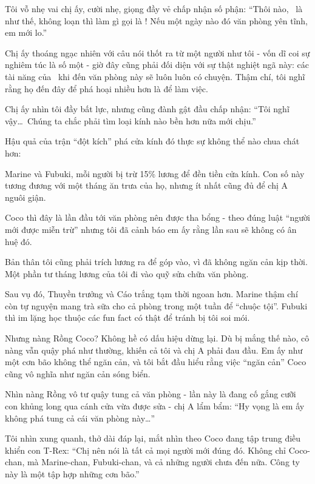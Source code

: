 \documentclass[../main.tex]{subfiles}
\begin{document}
Tôi vỗ nhẹ vai chị ấy, cười nhẹ, giọng đầy vẻ chấp nhận số phận: ``Thôi nào, \hll\ là như thế, không loạn thì làm gì gọi là \hll! Nếu một ngày nào đó văn phòng yên tĩnh, em mới lo.''

Chị ấy thoáng ngạc nhiên với câu nói thốt ra từ một người như tôi - vốn dĩ coi sự nghiêm túc là số một - giờ đây cũng phải đối diện với sự thật nghiệt ngã này: các tài năng của \hll\ khi đến văn phòng này sẽ luôn luôn có chuyện. Thậm chí, tôi nghĩ rằng họ đến đây để phá hoại nhiều hơn là để làm việc.

Chị ấy nhìn tôi đầy bất lực, nhưng cũng đành gật đầu chấp nhận: ``Tôi nghĩ vậy\dots\ Chúng ta chắc phải tìm loại kính nào bền hơn nữa mới chịu.''

\ct

Hậu quả của trận ``đột kích'' phá cửa kính đó thực sự không thể nào chua chát hơn:

Marine và Fubuki, mỗi người bị trừ 15\% lương để đền tiền cửa kính. Con số này tương đương với một tháng ăn trưa của họ, nhưng ít nhất cũng đủ để chị A nguôi giận.

Coco thì đây là lần đầu tới văn phòng nên được tha bổng - theo đúng luật ``người mới được miễn trừ'' nhưng tôi đã cảnh báo em ấy rằng lần sau sẽ không có ân huệ đó.

Bản thân tôi cũng phải trích lương ra để góp vào, vì đã không ngăn cản kịp thời. Một phần tư tháng lương của tôi đi vào quỹ sửa chữa văn phòng.

Sau vụ đó, Thuyền trưởng và Cáo trắng tạm thời ngoan hơn. Marine thậm chí còn tự nguyện mang trà sữa cho cả phòng trong một tuần để ``chuộc tội''. Fubuki thì im lặng học thuộc các fun fact có thật để tránh bị tôi soi mói.

Nhưng nàng Rồng Coco? Không hề có dấu hiệu dừng lại. Dù bị mắng thế nào, cô nàng vẫn quậy phá như thường, khiến cả tôi và chị A phải đau đầu. Em ấy như một cơn bão không thể ngăn cản, và tôi bắt đầu hiểu rằng việc ``ngăn cản'' Coco cũng vô nghĩa như ngăn cản sóng biển.

Nhìn nàng Rồng vô tư quậy tung cả văn phòng - lần này là đang cố gắng cưỡi con khủng long qua cánh cửa vừa được sửa - chị A lẩm bẩm: ``Hy vọng là em ấy không phá tung cả cái văn phòng này\dots''

Tôi nhìn xung quanh, thở dài đáp lại, mắt nhìn theo Coco đang tập trung điều khiển con T-Rex: ``Chị nên nói là tất cả mọi người mới đúng đó. Không chỉ Coco-chan, mà Marine-chan, Fubuki-chan, và cả những người chưa đến nữa. Công ty này là một tập hợp những cơn bão.''
\end{document}
